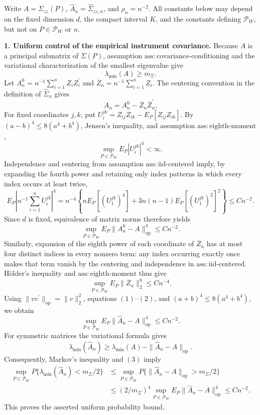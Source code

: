 Write \(A=\Sigma_{zz}(P)\), \(\widehat A_n=\widehat\Sigma_{zz,n}\), and \(\rho_n=n^{-2}\). All constants below may depend on the fixed dimension \(d\), the compact interval \(K\), and the constants defining \(\mathcal P_W\), but not on \(P\in\mathcal P_W\) or \(n\).

\textbf{1. Uniform control of the empirical instrument covariance.}
Because \(A\) is a principal submatrix of \(\Sigma(P)\), assumption \(\mathrm{ass:covariance\mbox{-}conditioning}\) and the variational characterization of the smallest eigenvalue give
\[
 \lambda_{\min}(A)\geq m_{\Sigma}.
\]
Let \(A_n^0=n^{-1}\sum_{i=1}^n Z_iZ_i^{\prime}\) and \(\overline Z_n=n^{-1}\sum_{i=1}^n Z_i\). The centering convention in the definition of \(\widehat\Sigma_n\) gives
\[
 \widehat A_n=A_n^0-\overline Z_n\overline Z_n^{\prime}.
\]
For fixed coordinates \(j,k\), put \(U_i^{jk}=Z_{ij}Z_{ik}-E_P[Z_{ij}Z_{ik}]\). By \((a-b)^4\leq 8(a^4+b^4)\), Jensen's inequality, and assumption \(\mathrm{ass:eighth\mbox{-}moment}\),
\[
 \sup_{P\in\mathcal P_W}E_P|U_i^{jk}|^4<\infty.
\]
Independence and centering from assumption \(\mathrm{ass:iid\mbox{-}centered}\) imply, by expanding the fourth power and retaining only index patterns in which every index occurs at least twice,
\[
 E_P\left|n^{-1}\sum_{i=1}^nU_i^{jk}\right|^4
 =n^{-4}\left\{nE_P[(U_1^{jk})^4]+3n(n-1)E_P[(U_1^{jk})^2]^2\right\}
 \leq Cn^{-2}.
\]
Since \(d\) is fixed, equivalence of matrix norms therefore yields
\[
 \sup_{P\in\mathcal P_W}E_P\|A_n^0-A\|_{\mathrm{op}}^4\leq Cn^{-2}. \tag{1}
\]
Similarly, expansion of the eighth power of each coordinate of \(\overline Z_n\) has at most four distinct indices in every nonzero term: any index occurring exactly once makes that term vanish by the centering and independence in \(\mathrm{ass:iid\mbox{-}centered}\). H\"older's inequality and \(\mathrm{ass:eighth\mbox{-}moment}\) thus give
\[
 \sup_{P\in\mathcal P_W}E_P\|\overline Z_n\|_2^8\leq Cn^{-4}. \tag{2}
\]
Using \(\|vv^{\prime}\|_{\mathrm{op}}=\|v\|_2^2\), equations \((1)\)--\((2)\), and \((a+b)^4\leq8(a^4+b^4)\), we obtain
\[
 \sup_{P\in\mathcal P_W}E_P\|\widehat A_n-A\|_{\mathrm{op}}^4\leq Cn^{-2}. \tag{3}
\]
For symmetric matrices the variational formula gives
\[
 \lambda_{\min}(\widehat A_n)
 \geq \lambda_{\min}(A)-\|\widehat A_n-A\|_{\mathrm{op}}.
\]
Consequently, Markov's inequality and \((3)\) imply
\[
 \begin{split}
 \sup_{P\in\mathcal P_W}P\{\lambda_{\min}(\widehat A_n)<m_{\Sigma}/2\}
 &\leq \sup_{P\in\mathcal P_W}P\{\|\widehat A_n-A\|_{\mathrm{op}}>m_{\Sigma}/2\}\\
 &\leq (2/m_{\Sigma})^4\sup_{P\in\mathcal P_W}E_P\|\widehat A_n-A\|_{\mathrm{op}}^4
 \leq Cn^{-2}. \tag{4}
 \end{split}
\]
This proves the asserted uniform probability bound.

